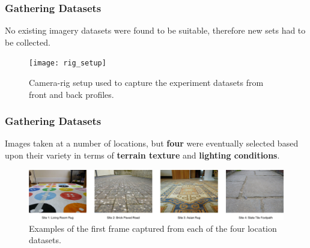 \documentclass[10pt, compress]{beamer}
\begin{document}

\begin{frame}[fragile]
  \frametitle{Gathering Datasets}
  
  No existing imagery datasets were found to be suitable, therefore new sets had to be collected.
  
  \vspace{5pt}
  
    \begin{figure}[ht!]
\centering
\texttt{[image: rig\_setup]}
\caption{Camera-rig setup used to capture the experiment datasets from front and back profiles.}
  \end{figure}
  
\end{frame}

\begin{frame}[fragile]
  \frametitle{Gathering Datasets}
  
  Images taken at a number of locations, but \textbf{four} were eventually selected based upon their variety in terms of \textbf{terrain texture} and \textbf{lighting conditions}.
  
  \vspace{15pt}
  
    \begin{figure}[ht!]
\centering
\includegraphics[scale=0.27]{locations}
\caption{Examples of the first frame captured from each of the four location datasets.}
  \end{figure}
  
\end{frame}
\end{document}
